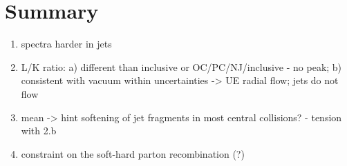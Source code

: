 \section{Summary}
\label{sec:con}

\begin{enumerate}
	\item spectra harder in jets
	\item L/K ratio: a) different than inclusive or OC/PC/NJ/inclusive - no peak; b) consistent with vacuum within uncertainties -> UE radial flow; jets do not flow
	\item mean \pt -> hint softening of jet fragments in most central collisions? - tension with 2.b
	\item constraint on the soft-hard parton recombination (?)
\end{enumerate}

